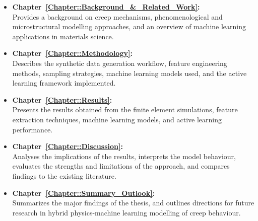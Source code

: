 \documentclass[class=scrbook, crop=false]{standalone}
\begin{document}
\begin{itemize}
	\item \textbf{Chapter~\ref{Chapter::Background_&_Related_Work}:~} \\
	Provides a background on creep mechanisms, phenomenological and microstructural modelling approaches, and an overview of machine learning applications in materials science.
		
	\item \textbf{Chapter~\ref{Chapter::Methodology}:~} \\
	Describes the synthetic data generation workflow, feature engineering methods, sampling strategies, machine learning models used, and the active learning framework implemented.
	
	\item \textbf{Chapter~\ref{Chapter::Results}:~} \\
	Presents the results obtained from the finite element simulations, feature extraction techniques, machine learning models, and active learning performance.
	
	\clearpage
	\item \textbf{Chapter~\ref{Chapter::Discussion}:~} \\
	Analyses the implications of the results, interprets the model behaviour, evaluates the strengths and limitations of the approach, and compares findings to the existing literature.
	
	\item \textbf{Chapter~\ref{Chapter::Summary_Outlook}:~} \\
	Summarizes the major findings of the thesis, and outlines directions for future research in hybrid physics-machine learning modelling of creep behaviour.
\end{itemize}

\ifstandalone
    \printglossary
    \printbibliography[heading=bibintoc]
\fi
\end{document}

